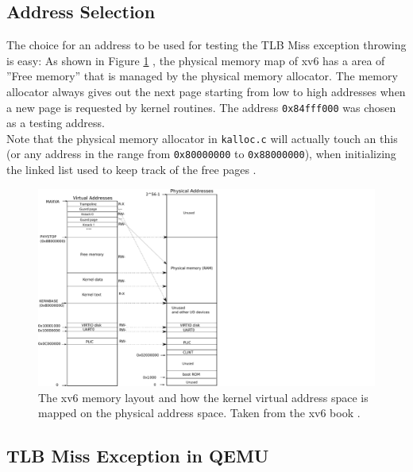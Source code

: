 \subsection{Address Selection}
The choice for an address to be used for testing the TLB Miss exception throwing is easy:
As shown in Figure \ref{impl:xv6layout} \cite{cox2011xv6}, the physical memory map of xv6 has a
area of ''Free memory'' that is managed by the physical memory allocator. The memory allocator
always gives out the next page starting from low to high addresses when a new page is requested
by kernel routines. The address \texttt{0x84fff000} was chosen as a testing address.\\
Note that the physical memory allocator in \texttt{kalloc.c} will actually touch an this (or
any address in the range from \texttt{0x80000000} to \texttt{0x88000000}), when initializing
the linked list used to keep track of the free pages \cite{cox2011xv6}.

\begin{figure}[t!]
    \centering
    \includegraphics[scale=.5]{figures/xv6_layout.pdf}
    \caption[xv6 memory layout]{The xv6 memory layout and how the kernel virtual address space is mapped on
        the physical address space. Taken from the xv6 book \cite{cox2011xv6}.}
    \label{impl:xv6layout}
\end{figure}


\subsection{TLB Miss Exception in QEMU}

